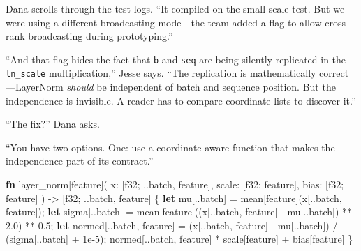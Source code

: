 \documentclass[11pt,]{article}
\newenvironment{Shaded}{}{}
\newcommand{\DataTypeTok}[1]{\textcolor[rgb]{0.56,0.13,0.00}{#1}}
\newcommand{\DecValTok}[1]{\textcolor[rgb]{0.25,0.63,0.44}{#1}}
\newcommand{\KeywordTok}[1]{\textcolor[rgb]{0.00,0.44,0.13}{\textbf{#1}}}
\newcommand{\NormalTok}[1]{#1}
\newcommand{\OperatorTok}[1]{\textcolor[rgb]{0.40,0.40,0.40}{#1}}
\begin{document}
Dana scrolls through the test logs. ``It compiled on the small-scale
test. But we were using a different broadcasting mode---the team added a
flag to allow cross-rank broadcasting during prototyping.''

``And that flag hides the fact that \texttt{b} and \texttt{seq} are
being silently replicated in the \texttt{ln\_scale} multiplication,''
Jesse says. ``The replication is mathematically correct---LayerNorm
\emph{should} be independent of batch and sequence position. But the
independence is invisible. A reader has to compare coordinate lists to
discover it.''

``The fix?'' Dana asks.

``You have two options. One: use a coordinate-aware function that makes
the independence part of its contract.''

\begin{Shaded}
\begin{Highlighting}[]
\KeywordTok{fn}\NormalTok{ layer_norm[feature](}
\NormalTok{    x: }\OperatorTok{[}\DataTypeTok{f32}\NormalTok{; ..batch, feature}\OperatorTok{]}\NormalTok{,}
\NormalTok{    scale: }\OperatorTok{[}\DataTypeTok{f32}\NormalTok{; feature}\OperatorTok{]}\NormalTok{,}
\NormalTok{    bias: }\OperatorTok{[}\DataTypeTok{f32}\NormalTok{; feature}\OperatorTok{]}
\NormalTok{) -> }\OperatorTok{[}\DataTypeTok{f32}\NormalTok{; ..batch, feature}\OperatorTok{]} \OperatorTok{\{}
    \KeywordTok{let}\NormalTok{ mu}\OperatorTok{[}\NormalTok{..batch}\OperatorTok{]}\NormalTok{ = mean}\OperatorTok{[}\NormalTok{feature}\OperatorTok{]}\NormalTok{(x}\OperatorTok{[}\NormalTok{..batch, feature}\OperatorTok{]}\NormalTok{);}
    \KeywordTok{let}\NormalTok{ sigma}\OperatorTok{[}\NormalTok{..batch}\OperatorTok{]}\NormalTok{ = mean}\OperatorTok{[}\NormalTok{feature}\OperatorTok{]}\NormalTok{((x}\OperatorTok{[}\NormalTok{..batch, feature}\OperatorTok{]}\NormalTok{ - mu}\OperatorTok{[}\NormalTok{..batch}\OperatorTok{]}\NormalTok{) ** }\DecValTok{2.0}\NormalTok{) ** }\DecValTok{0.5}\NormalTok{;}
    \KeywordTok{let}\NormalTok{ normed}\OperatorTok{[}\NormalTok{..batch, feature}\OperatorTok{]}\NormalTok{ = (x}\OperatorTok{[}\NormalTok{..batch, feature}\OperatorTok{]}\NormalTok{ - mu}\OperatorTok{[}\NormalTok{..batch}\OperatorTok{]}\NormalTok{) / (sigma}\OperatorTok{[}\NormalTok{..batch}\OperatorTok{]}\NormalTok{ + }\DecValTok{1}\NormalTok{e-}\DecValTok{5}\NormalTok{);}
\NormalTok{    normed}\OperatorTok{[}\NormalTok{..batch, feature}\OperatorTok{]}\NormalTok{ * scale}\OperatorTok{[}\NormalTok{feature}\OperatorTok{]}\NormalTok{ + bias}\OperatorTok{[}\NormalTok{feature}\OperatorTok{]}
\OperatorTok{\}}
\end{Highlighting}
\end{Shaded}
\end{document}
